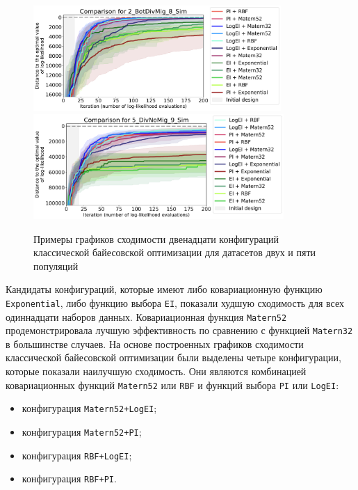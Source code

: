 \begin{figure}
    \centering
        \includegraphics[height=4.0cm]{images_experiments/bo_hpo/BO_config/2_BotDivMig_8_Sim_bo_conf.pdf}
        \includegraphics[height=4.0cm]{images_experiments/bo_hpo/BO_config/5_DivNoMig_9_Sim_bo_conf.pdf}
    \caption{Примеры графиков сходимости двенадцати конфигураций классической байесовской оптимизации для датасетов двух и пяти популяций}
    \label{fig:part2:bo_hpo:bo_config}
\end{figure}

Кандидаты конфигураций, которые имеют либо ковариационную функцию \texttt{Exponential}, либо функцию выбора \texttt{EI}, показали худшую сходимость для всех одиннадцати наборов данных.
Ковариационная функция \texttt{Matern52} продемонстрировала лучшую эффективность по сравнению с функцией \texttt{Matern32} в большинстве случаев.
На основе построенных графиков сходимости классической байесовской оптимизации были выделены четыре конфигурации, которые показали наилучшую сходимость.
Они являются комбинацией ковариационных функций \texttt{Matern52} или \texttt{RBF} и функций выбора \texttt{PI} или \texttt{LogEI}:
\begin{itemize}
    \item конфигурация \texttt{Matern52+LogEI};
    \item конфигурация \texttt{Matern52+PI};
    \item конфигурация \texttt{RBF+LogEI};
    \item конфигурация \texttt{RBF+PI}.
\end{itemize}


